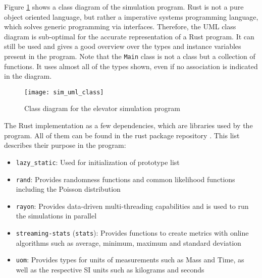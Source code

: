 Figure \ref{fig:impl:simclass} shows a class diagram of the simulation program.
Rust is not a pure object oriented language, but rather a imperative systems programming language, which solves generic programming via interfaces.
Therefore, the \ac{UML} class diagram is sub-optimal for the accurate representation of a Rust program.
It can still be used and gives a good overview over the types and instance variables present in the program.
Note that the \texttt{Main} class is not a class but a collection of functions.
It uses almost all of the types shown, even if no association is indicated in the diagram.

\begin{figure}[p]
    \centering
    \texttt{[image: sim\_uml\_class]}
    \caption{Class diagram for the elevator simulation program}
    \label{fig:impl:simclass}
\end{figure}

The Rust implementation as a few dependencies, which are libraries used by the program.
All of them can be found in the rust package repository \autocite[][]{rust2018cratesio}.
This list describes their purpose in the program:
\begin{samepage}
\begin{itemize}[noitemsep]
    \item \texttt{lazy\_static}: Used for initialization of prototype list
    \item \texttt{rand}: Provides randomness functions and common likelihood functions including the Poisson distribution
    \item \texttt{rayon}: Provides data-driven multi-threading capabilities and is used to run the simulations in parallel
    \item \texttt{streaming-stats} (\texttt{stats}): Provides functions to create metrics with online algorithms such as average,  minimum, maximum and standard deviation
    \item \texttt{uom}: Provides types for units of measurements such as Mass and Time, as well as the respective \ac{SI} units such as kilograms and seconds
\end{itemize}
\end{samepage}

